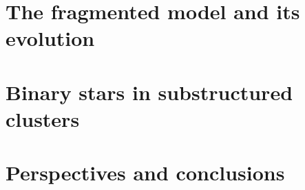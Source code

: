 \documentclass[a4paper,11pt,twoside,openright]{book}
\begin{document}
    \frontmatter
    
    \pagestyle{empty}
    
    
     \dominitoc
    
    \pagestyle{front}

	
    \tableofcontents
    
    \mainmatter
    

%
%    
    
    
    
    
    \part{The fragmented model and its evolution}
    
    
       

    \part{Binary stars in substructured clusters}
    	
      
      	     
    
    \part{Perspectives and conclusions}
	


    \pagestyle{introduction}
    \label{Biblio}
    
    
    
    \appendix




    
    
    \backmatter
    \listoffigures
    \listoftables
%     
\end{document}
